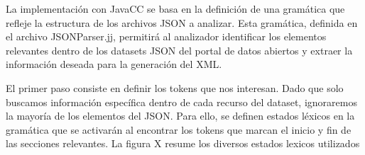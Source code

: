 



\noindent La implementación con JavaCC se basa en la definición de una gramática que refleje la estructura de los archivos JSON a analizar. Esta gramática, definida en el archivo JSONParser.jj, permitirá al analizador identificar los elementos relevantes dentro de los datasets JSON del portal de datos abiertos y extraer la información deseada para la generación del XML.

El primer paso consiste en definir los tokens que nos interesan. Dado que solo buscamos información específica dentro de cada recurso del dataset, ignoraremos la mayoría de los elementos del JSON. Para ello, se definen estados léxicos en la gramática que se activarán al encontrar los tokens que marcan el inicio y fin de las secciones relevantes. La figura X resume los diversos estados lexicos utilizados

